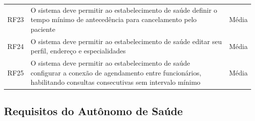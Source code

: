 \begin{table}[H]
\begin{tabular}{p{1.2cm}p{6.5cm}p{2.5cm}}
    RF23 & O sistema deve permitir ao estabelecimento de saúde
           definir o tempo mínimo de antecedência
           para cancelamento pelo paciente
         & Média \\
    RF24 & O sistema deve permitir ao estabelecimento de saúde
           editar seu perfil, endereço e
           especialidades
         & Média \\
    RF25 & O sistema deve permitir ao estabelecimento de saúde
           configurar a conexão de agendamento
           entre funcionários, habilitando
           consultas consecutivas sem intervalo
           mínimo
         & Média \\
    \bottomrule
  \end{tabular}
\end{table}

\subsection{Requisitos do Autônomo de Saúde}
\label{subsec:professional-requirements}

